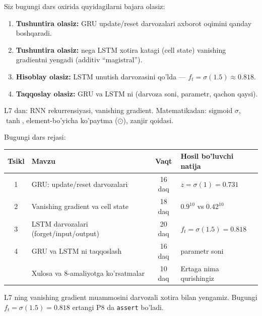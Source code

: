 \documentclass[aspectratio=169,11pt]{beamer}
\begin{document}
\begin{frame}{Siz bugungi dars oxirida quyidagilarni bajara olasiz:}
  \begin{enumerate}\setlength\itemsep{6pt}
    \item \textbf{Tushuntira olasiz:} GRU update/reset darvozalari axborot oqimini
          qanday boshqaradi.
    \item \textbf{Tushuntira olasiz:} nega LSTM xotira katagi (cell state)
          vanishing gradientni yengadi (additiv ``magistral'').
    \item \textbf{Hisoblay olasiz:} LSTM unutish darvozasini qo'lda ---
          $f_t=\sigma(1.5)\approx 0.818$.
    \item \textbf{Taqqoslay olasiz:} GRU va LSTM ni (darvoza soni, parametr,
          qachon qaysi).
  \end{enumerate}
  \vspace{4pt}
  \begin{tcolorbox}[defbox,title=Oldindan talab]
    \footnotesize
    L7 dan: RNN rekurrensiyasi, vanishing gradient. Matematikadan: sigmoid $\sigma$,
    $\tanh$, element-bo'yicha ko'paytma ($\odot$), zanjir qoidasi.
  \end{tcolorbox}
\end{frame}

\begin{frame}{Bugungi dars rejasi:}
  \begin{center}
  \small
  \begin{tabular}{c p{5.0cm} c p{3.2cm}}
    \toprule
    \textbf{Tsikl}& \textbf{Mavzu} & \textbf{Vaqt} & \textbf{Hosil bo'luvchi natija}\\
    \midrule
    1 & GRU: update/reset darvozalari & 16 daq & $z=\sigma(1)=0.731$ \\
    2 & Vanishing gradient va cell state & 18 daq & $0.9^{10}$ vs $0.42^{10}$ \\
    3 & LSTM darvozalari (forget/input/output) & 20 daq & $f_t=\sigma(1.5)=0.818$ \\
    4 & GRU va LSTM ni taqqoslash & 16 daq & parametr soni \\
    \midrule
      & Xulosa va 8-amaliyotga ko'rsatmalar & 10 daq & Ertaga nima qurishingiz \\
    \bottomrule
  \end{tabular}
  \end{center}
  \vspace{4pt}
  \begin{tcolorbox}[warnbox,title=Bu dars RNN ni ``tuzatadi'']
    \footnotesize\sloppy
    L7 ning vanishing gradient muammosini darvozali xotira bilan yengamiz.
    Bugungi $f_t=\sigma(1.5)=0.818$ ertangi P8 da \texttt{assert} bo'ladi.
  \end{tcolorbox}
\end{frame}
\end{document}
